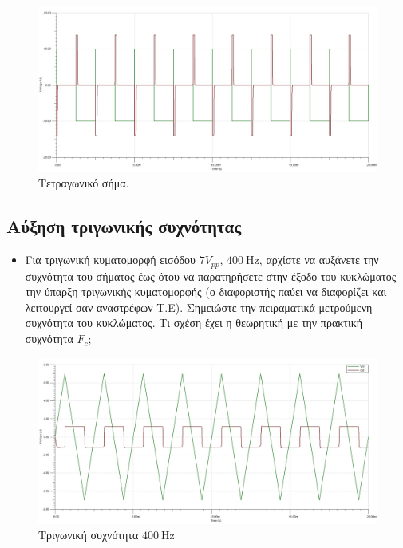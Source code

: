 \documentclass[12pt]{article}
\begin{document}
\begin{figure}[H]
	\centering
	\includegraphics[width=\linewidth]{./res/square.jpg}
	\caption{Τετραγωνικό σήμα.}
\end{figure}

\subsection{Αύξηση τριγωνικής συχνότητας}

\begin{itemize}
	\item Για τριγωνική κυματομορφή εισόδου $7V_{pp}$, $\SI{400}{\hertz}$,
		αρχίστε να αυξάνετε την συχνότητα του σήματος έως ότου να
		παρατηρήσετε στην έξοδο του κυκλώματος την ύπαρξη τριγωνικής
		κυματομορφής (ο διαφοριστής παύει να διαφορίζει και λειτουργεί
		σαν αναστρέφων Τ.Ε). Σημειώστε την πειραματικά μετρούμενη
		συχνότητα του κυκλώματος. Τι σχέση έχει η θεωρητική με την
		πρακτική συχνότητα $F_c$;
\end{itemize}

\begin{figure}[H]
	\centering
	\includegraphics[width=\linewidth]{./res/triang_400hz.jpg}
	\caption{Τριγωνική συχνότητα $\SI{400}{\hertz}$}
\end{figure}
\end{document}
